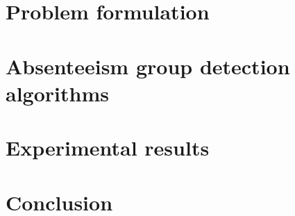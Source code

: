 \documentclass[twoside,leqno,twocolumn]{article}
\begin{document}
\section{Problem formulation} \label{sec:problem}


\section{Absenteeism group detection algorithms} \label{sec:algorithm}

%
\section{Experimental results} \label{sec:experiemnt}


\section{Conclusion} \label{sec:conclusion}



%




\end{document}
